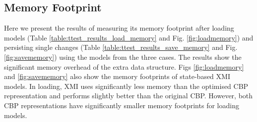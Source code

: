 \documentclass{llncs}
\begin{document}
    \subsection{Memory Footprint}
    \label{subsec:memory_consumption}
    Here we present the results of measuring its memory footprint after loading models (Table \ref{table:ttest_results_load_memory} and Fig. \ref{fig:loadmemory}) and persisting single changes (Table \ref{table:ttest_results_save_memory} and Fig. \ref{fig:savememory}) using the models from the three cases. The results show the significant memory overhead of the extra data structure.   Figs \ref{fig:loadmemory} and \ref{fig:savememory}  also show the memory footprints of state-based XMI models. In loading, XMI uses significantly less memory than the optimised CBP representation and performs slightly better than the original CBP.  However, both CBP representations have significantly smaller memory  footprints for loading models.
   
\end{document}
